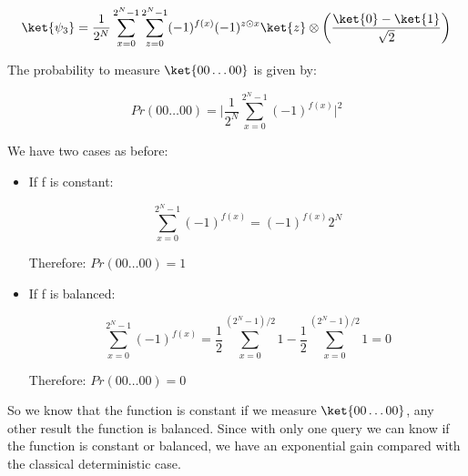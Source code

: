 \begin{equation}
    \ket{\psi_3} = \frac{1}{2^{N}} \sum_{x=0}^{2^N -1} \sum_{z=0}^{2^N - 1} (-1)^{f(x)}   (-1)^{z \odot x} \ket{z} \otimes \bigg( \frac{ \ket{0} - \ket{1}}{\sqrt{2}} \bigg)
\end{equation}

The probability to measure $\ket{00\dots00}$ is given by: 

\begin{equation}
    Pr(00 \dots 00) = \Bigg| \frac{1}{2^N} \sum_{x=0}^{2^N-1} (-1)^{f(x)} \Bigg|^2
\end{equation}

We have two cases as before:

\begin{itemize}
    \item If f is constant:
    
    \begin{equation}
        \sum_{x=0}^{2^N-1} (-1)^{f(x)} = (-1)^{f(x)} 2^N
    \end{equation}
     
    Therefore: $Pr(00\dots00) = 1$
    
    \item If f is balanced:
    
    \begin{equation}
        \sum_{x=0}^{2^N-1} (-1)^{f(x)} = \frac{1}{2} \sum_{x=0}^{(2^N-1)/2} 1 - \frac{1}{2} \sum_{x=0}^{(2^N-1)/2} 1 = 0
    \end{equation}
    
    Therefore: $Pr(00\dots00) = 0$
    
\end{itemize}

So we know that the function is constant if we measure $\ket{00\dots00}$, any other result the function is balanced. Since with only one query we can know if the function is constant or balanced, we have an exponential gain compared with the classical deterministic case.